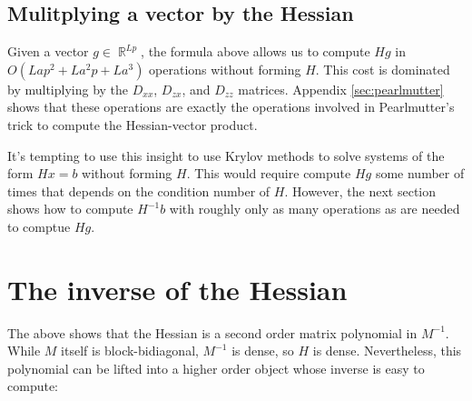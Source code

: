 \documentclass{article}
\newcommand{\R}{\mathop{\mathbb{R}}}
\begin{document}
\subsection{Mulitplying a vector by the Hessian}

Given a vector $g \in \R^{Lp}$, the formula above allows us to compute $H g$ in $O\left(Lap^2 + L a^2p +La^3\right)$
operations without forming $H$. This cost is dominated by multiplying by the $D_{xx}$, $D_{zx}$, and $D_{zz}$ matrices.
Appendix \ref{sec:pearlmutter} shows that these operations are exactly the operations involved in Pearlmutter's trick
to compute the Hessian-vector product.

It's tempting to use this insight to use Krylov methods to solve systems of the form $H x = b$ without forming $H$.
This would require compute $H g$ some number of times that depends on the condition number of $H$. However, the next
section shows how to compute $H^{-1} b$ with roughly only as many operations as are needed to comptue $H g$.

\section{The inverse of the Hessian}

The above shows that the Hessian is a second order matrix polynomial in $M^{-1}$. While $M$ itself is block-bidiagonal,
$M^{-1}$ is dense, so $H$ is dense. Nevertheless, this polynomial can be lifted into a higher order object whose
inverse is easy to compute:
\end{document}
